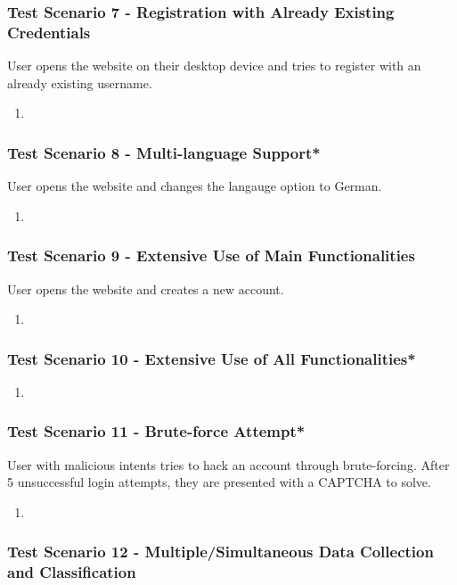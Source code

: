 \subsubsection{Test Scenario 7 - Registration with Already Existing Credentials}
User opens the website on their desktop device and tries to register with an already existing username.
\begin{enumerate}
    \item 
\end{enumerate}
\subsubsection{Test Scenario 8 - Multi-language Support*}
User opens the website and changes the langauge option to German. 
\begin{enumerate}
    \item 
\end{enumerate}
\subsubsection{Test Scenario 9 - Extensive Use of Main Functionalities}
User opens the website and creates a new account. 
\begin{enumerate}
    \item 
\end{enumerate}
\subsubsection{Test Scenario 10 - Extensive Use of All Functionalities*}

\begin{enumerate}
    \item 
\end{enumerate}
\subsubsection{Test Scenario 11 - Brute-force Attempt*}
User with malicious intents tries to hack an account through brute-forcing. After 5 unsuccessful login attempts, they are presented with a CAPTCHA to solve.
\begin{enumerate}
    \item 
\end{enumerate}
\subsubsection{Test Scenario 12 - Multiple/Simultaneous Data Collection and Classification}
